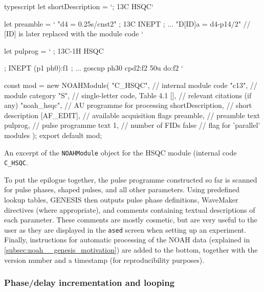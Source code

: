\begin{mylisting}[!ht] %
\begin{tcbminted}{typescript}
let shortDescription = `; 13C HSQC`

let preamble = `
"d4      = 0.25s/cnst2"                ; 13C INEPT
; ...
"D[ID]a  = d4-p14/2"    // [ID] is later replaced with the module code
`

let pulprog = `
  ; 13C-1H HSQC

  ; INEPT
  (p1 ph0):f1
  ; ...
  goscnp ph30 cpd2:f2
  50u do:f2
`

const mod = new NOAHModule(
    "C_HSQC",           // internal module code
    "c13",              // module category
    "S",                // single-letter code, Table 4.1
    [],                 // relevant citations (if any)
    "noah_hsqc",        // AU programme for processing
    shortDescription,   // short description
    [AF_EDIT],          // available acquisition flags
    preamble,           // preamble text
    pulprog,            // pulse programme text
    1,                  // number of FIDs
    false               // flag for 'parallel' modules
);
export default mod;
\end{tcbminted}
\caption[HSQC \texttt{NOAHModule} object]{An excerpt of the \texttt{NOAHModule} object for the HSQC module (internal code \texttt{C\_HSQC}.}
    \label{lst:module_c_hsqc}
\end{mylisting} %

To put the epilogue together, the pulse programme constructed so far is scanned for pulse phases, shaped pulses, and all other parameters.
Using predefined lookup tables, GENESIS then outputs pulse phase definitions, WaveMaker directives (where appropriate), and comments containing textual descriptions of each parameter.
These comments are mostly cosmetic, but are very useful to the user as they are displayed in the \texttt{ased} screen when setting up an experiment.
Finally, instructions for automatic processing of the NOAH data (explained in \cref{subsec:noah__genesis_motivation}) are added to the bottom, together with the version number and a timestamp (for reproducibility purposes).

\subsubsection{Phase/delay incrementation and looping}

